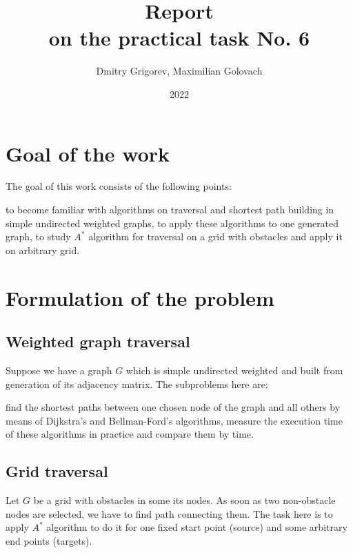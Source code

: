 \documentclass[12pt, bachelor, substylefile = algo_title.rtx]{disser}
\theoremstyle{definition}
\begin{document}
\title{Report\\
on the practical task No. 6}


\author{Dmitry Grigorev, Maximilian Golovach}
\sastatus {}

\date{2022}

\maketitle
\section{Goal of the work}
The goal of this work consists of the following points:
\begin{outline}
\1 to become familiar with algorithms on traversal and shortest path building in simple undirected weighted graphs,
\1 to apply these algorithms to one generated graph,
\1 to study $A^*$ algorithm for traversal on a grid with obstacles and apply it on arbitrary grid.
\end{outline}

\section{Formulation of the problem}
\subsection{Weighted graph traversal}
Suppose we have a graph $G$ which is simple undirected weighted and built from generation of its adjacency matrix. The subproblems here are:
\begin{outline}[enumerate]
\1 find the shortest paths between one chosen node of the graph and all others by means of Dijkstra's and Bellman-Ford's algorithms,
\1 measure the execution time of these algorithms in practice and compare them by time.
\end{outline}
\subsection{Grid traversal}
Let $G$ be a grid with obstacles in some its nodes. As soon as two non-obstacle nodes are selected, we have to find path connecting them. The task here is to apply $A^*$ algorithm to do it for one fixed start point (source) and some arbitrary end points (targets).
\end{document}
